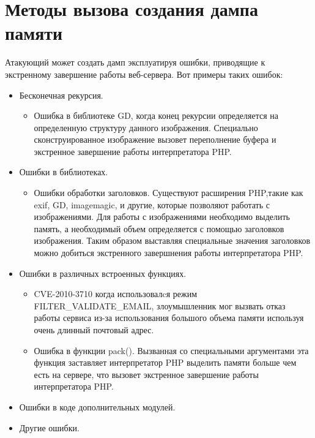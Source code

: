 \documentclass[20pt]{article}
\begin{document}
\newpage

\section{Методы вызова создания дампа памяти}

Атакующий может создать дамп эксплуатируя ошибки, приводящие к экстренному
завершение работы веб-сервера. Вот примеры таких ошибок\cite{php/crash}:
\begin{itemize}
  \item  Бесконечная рекурсия.
    \begin{itemize}
      \item Ошибка в библиотеке GD, когда конец рекурсии определяется на определенную
      структуру данного изображения. Специально сконструированное изображение вызовет
      переполнение буфера и экстренное завершение работы интерпретатора PHP.
    \end{itemize}
  \item Ошибки в библиотеках.
    \begin{itemize}
      \item Ошибки обработки заголовков. Существуют расширения PHP,такие как exif, GD,
        imagemagic, и другие, которые позволяют работать с изображениями. Для работы
        с изображениями необходимо выделить память, а необходимый объем определяется
        с помощью заголовков изображения. Таким образом выставляя специальные значения
        заголовков можно добиться экстренного завершнения работы интерпретатора PHP.
    \end{itemize}
  \item Ошибки в различных встроенных функциях.
    \begin{itemize}
      \item CVE-2010-3710\cite{cve-2010-3710} когда использовалcя режим
      FILTER\_VALIDATE\_EMAIL, злоумышленник мог вызвать отказ работы сервиса
      из-за использования большого объема памяти используя очень длинный почтовый адрес.
      \item Ошибка в функции pack(). Вызванная со специальными аргументами эта функция
        заставляет интерпретатор PHP выделить памяти больше чем есть на сервере, что
        вызовет экстренное завершение работы интерпретатора PHP.
    \end{itemize}
 \item Ошибки в коде дополнительных модулей.
 \item Другие ошибки.
\end{itemize}
\end{document}

